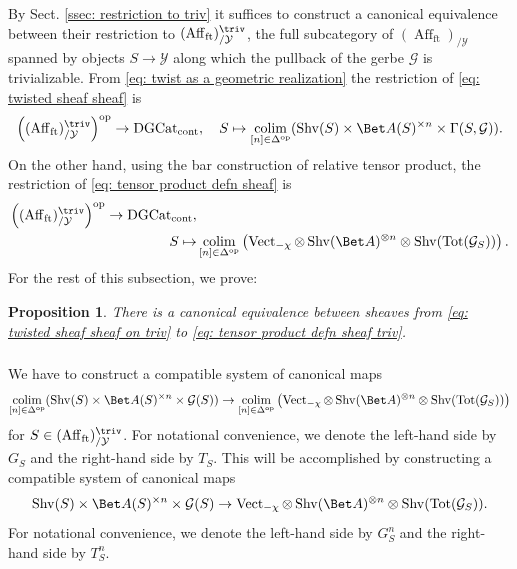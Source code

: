 \documentclass[10pt]{amsart}
\newcommand{\sssec}{\subsubsection}
\newtheorem{prop}[subsubsection]{Proposition}
\theoremstyle{remark}
\newcommand{\on}{\operatorname}
\newcommand{\cG}{\mathcal{G}}
\newcommand{\cY}{\mathcal{Y}}
\newcommand{\DGcat}{\on{DGCat}_{\on{cont}}}
\newcommand{\Vect}{\on{Vect}}
\newcommand{\Shv}{\on{Shv}}
\newcommand{\Affft}{\on{Aff}_{\on{ft}}}
\DeclareMathOperator{\op}{op}
\DeclareMathOperator{\colim}{colim}
\begin{document}
\sssec{}
By Sect. \ref{ssec: restriction to triv} it suffices to construct a canonical equivalence between their restriction to $(\Affft)_{/\cY}^{\triv}$, the full subcategory of $(\Affft)_{/\cY}$ spanned by objects $S\rightarrow \cY$ along which the pullback of the gerbe $\cG$ is trivializable. From \eqref{eq: twist as a geometric realization} the restriction of \eqref{eq: twisted sheaf sheaf} is
\begin{equation}\label{eq: twisted sheaf sheaf on triv}
    \left((\Affft)^{\triv}_{/\cY}\right)^{\op}\rightarrow \DGcat,\quad S\mapsto \colim_{[n]\in\Delta^{\op}}(\Shv(S)\times \Bet A(S)^{\times n}\times \Gamma(S,\cG)).
\end{equation}
On the other hand, using the bar construction of relative tensor product, the restriction of \eqref{eq: tensor product defn sheaf} is
\begin{align}\label{eq: tensor product defn sheaf triv}
    \left((\Affft)^{\triv}_{/\cY}\right)^{\op}\rightarrow \DGcat,& \\
    S\mapsto & \colim_{[n]\in\Delta^{\op}}\left(\Vect_{-\chi}\otimes \Shv(\Bet A)^{\otimes n}\otimes \Shv(\on{Tot}(\cG_S))\right).\nonumber
\end{align}
For the rest of this subsection, we prove:

\begin{prop}\label{prop: equiv btw sheaves triv}
    There is a canonical equivalence between sheaves from \eqref{eq: twisted sheaf sheaf on triv} to \eqref{eq: tensor product defn sheaf triv}.
\end{prop}

\sssec{}\label{sssec: GnS TnS}
We have to construct a compatible system of canonical maps
\begin{equation}\label{eq: map between bar constructions}
    \colim_{[n]\in\Delta^{\op}}(\Shv(S)\times \Bet A(S)^{\times n}\times \cG(S))\rightarrow \colim_{[n]\in\Delta^{\op}} \left(\Vect_{-\chi}\otimes \Shv(\Bet A)^{\otimes n}\otimes \Shv(\on{Tot}(\cG_S))\right)
\end{equation}
for $S\in (\Affft)^{\triv}_{/\cY}$. For notational convenience, we denote the left-hand side by $G_S$ and the right-hand side by $T_S$. This will be accomplished by constructing a compatible system of canonical maps
\begin{equation}\label{eq: trivialization box tensor map}
    \Shv(S)\times \Bet A(S)^{\times n}\times \cG(S)\rightarrow \Vect_{-\chi}\otimes \Shv(\Bet A)^{\otimes n}\otimes \Shv(\on{Tot}(\cG_S)).
\end{equation}
For notational convenience, we denote the left-hand side by $G^n_S$ and the right-hand side by $T^n_S$.
\end{document}
